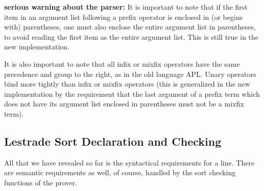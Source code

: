 \documentclass[12pt]{article}
\begin{document}
\begin{description}
{\bf serious warning about the parser:} It is important to note that if the first item in an argument list following a prefix operator is enclosed in (or begins with)  parentheses, one must also enclose the entire argument list in parentheses, to avoid reading the first item as the entire argument list.  This is still true in the new implementation.

It is also important to note that all infix or mixfix operators have the same precedence and group to the right, as in the old language APL.  Unary operators bind more tightly than infix or mixfix operators (this is generalized in the new implementation by the requirement that the last argument of a prefix term which does not have its argument list enclosed in parentheses must not be a mixfix term).

\end{description}

\subsection{Lestrade Sort Declaration and Checking}

All that we have revealed so far is the syntactical requirements for a line.   There are semantic requirements as well, of course, handled by the sort checking functions of the prover.
\end{document}

